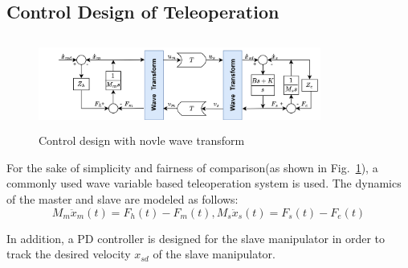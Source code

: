 \subsection{Control Design of Teleoperation}
\begin{figure}[htbp]
    \centerline{\includegraphics[height=3cm,width=9.3cm]{over_schemal.jpg}}
    \caption{Control design with novle wave transform}
    \label{fig4}
\end{figure}
\par For the sake of simplicity and fairness of comparison(as shown in Fig.~\ref{fig4}),
a commonly used wave variable based teleoperation system is used.
The dynamics of the master and slave are modeled as follows:
\begin{equation}
    M_m \ddot x_m(t) = F_h(t)-F_m(t),M_s \ddot x_s(t) = F_s(t)-F_e(t) \label{eq14}
\end{equation}
\par In addition,
a PD controller is designed for the slave manipulator
in order to track the desired velocity $x_{sd}$ of the slave manipulator.


